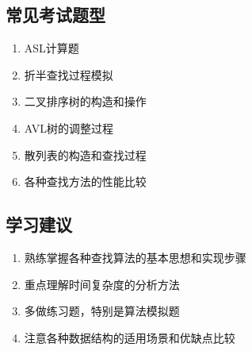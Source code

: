 \documentclass[12pt,a4paper]{amsart}
\begin{document}
\subsection{常见考试题型}
\begin{enumerate}
\item ASL计算题
\item 折半查找过程模拟
\item 二叉排序树的构造和操作
\item AVL树的调整过程
\item 散列表的构造和查找过程
\item 各种查找方法的性能比较
\end{enumerate}

\subsection{学习建议}
\begin{enumerate}
\item 熟练掌握各种查找算法的基本思想和实现步骤
\item 重点理解时间复杂度的分析方法
\item 多做练习题，特别是算法模拟题
\item 注意各种数据结构的适用场景和优缺点比较
\end{enumerate}
\end{document}
